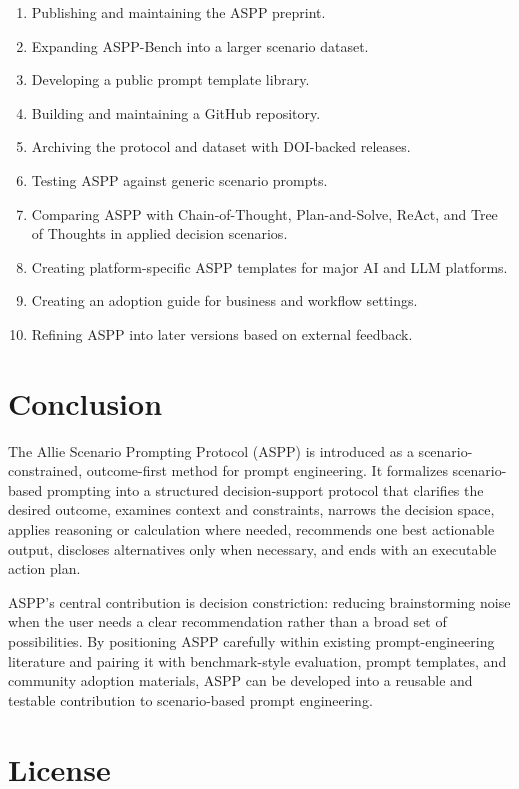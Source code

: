\documentclass[11pt]{article}
\begin{document}
\begin{enumerate}[leftmargin=*]
    \item Publishing and maintaining the ASPP preprint.
    \item Expanding ASPP-Bench into a larger scenario dataset.
    \item Developing a public prompt template library.
    \item Building and maintaining a GitHub repository.
    \item Archiving the protocol and dataset with DOI-backed releases.
    \item Testing ASPP against generic scenario prompts.
    \item Comparing ASPP with Chain-of-Thought, Plan-and-Solve, ReAct, and Tree of Thoughts in applied decision scenarios.
    \item Creating platform-specific ASPP templates for major AI and LLM platforms.
    \item Creating an adoption guide for business and workflow settings.
    \item Refining ASPP into later versions based on external feedback.
\end{enumerate}

\section{Conclusion}

The Allie Scenario Prompting Protocol (ASPP) is introduced as a scenario-constrained, outcome-first method for prompt engineering. It formalizes scenario-based prompting into a structured decision-support protocol that clarifies the desired outcome, examines context and constraints, narrows the decision space, applies reasoning or calculation where needed, recommends one best actionable output, discloses alternatives only when necessary, and ends with an executable action plan.

ASPP's central contribution is decision constriction: reducing brainstorming noise when the user needs a clear recommendation rather than a broad set of possibilities. By positioning ASPP carefully within existing prompt-engineering literature and pairing it with benchmark-style evaluation, prompt templates, and community adoption materials, ASPP can be developed into a reusable and testable contribution to scenario-based prompt engineering.

\section*{License}
\end{document}
